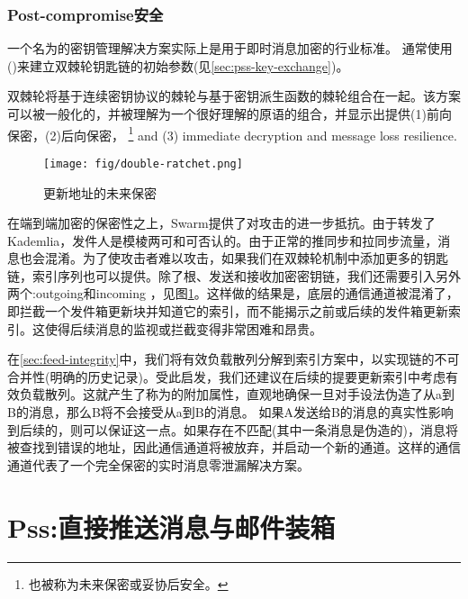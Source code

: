\subsubsection{Post-compromise安全}

一个名为的密钥管理解决方案实际上是用于即时消息加密的行业标准。
通常使用 ()来建立双棘轮钥匙链的初始参数(见\ref{sec:pss-key-exchange})。

双棘轮将基于连续密钥协议的棘轮与基于密钥派生函数\cite{perrin2016double}的棘轮组合在一起。该方案可以被一般化的\cite{alwen2019double}，并被理解为一个很好理解的原语的组合，并显示出提供(1)前向保密，(2)后向保密，%
%
\footnote{也被称为未来保密或妥协后安全。}
%
and (3) immediate decryption and message loss resilience.


\begin{figure}[htbp]
\centering
\texttt{[image: fig/double-ratchet.png]}
\caption[未来的保密更新地址\statusorange]{更新地址的未来保密}
\label{fig:double-ratchet-for-feeds}
\end{figure}

在端到端加密的保密性之上，Swarm提供了对攻击的进一步抵抗。由于转发了Kademlia，发件人是模棱两可和可否认的。由于正常的推同步和拉同步流量，消息也会混淆。为了使攻击者难以攻击，如果我们在双棘轮机制中添加更多的钥匙链，索引序列也可以提供。除了根、发送和接收加密密钥链，我们还需要引入另外两个:outgoing和incoming ，见图\ref{fig:double-ratchet-for-feeds}。这样做的结果是，底层的通信通道被混淆了，即拦截一个发件箱更新块并知道它的索引，而不能揭示之前或后续的发件箱更新索引。这使得后续消息的监视或拦截变得非常困难和昂贵。

在\ref{sec:feed-integrity}中，我们将有效负载散列分解到索引方案中，以实现链的不可合并性(明确的历史记录)。受此启发，我们还建议在后续的提要更新索引中考虑有效负载散列。这就产生了称为的附加属性，直观地确保一旦对手设法伪造了从a到B的消息，那么B将不会接受从a到B的消息。
如果A发送给B的消息的真实性影响到后续的，则可以保证这一点。如果存在不匹配(其中一条消息是伪造的)，消息将被查找到错误的地址，因此通信通道将被放弃，并启动一个新的通道。这样的通信通道代表了一个完全保密的实时消息零泄漏解决方案。




\section{Pss:直接推送消息与邮件装箱\statusgreen}\label{sec:pss}

